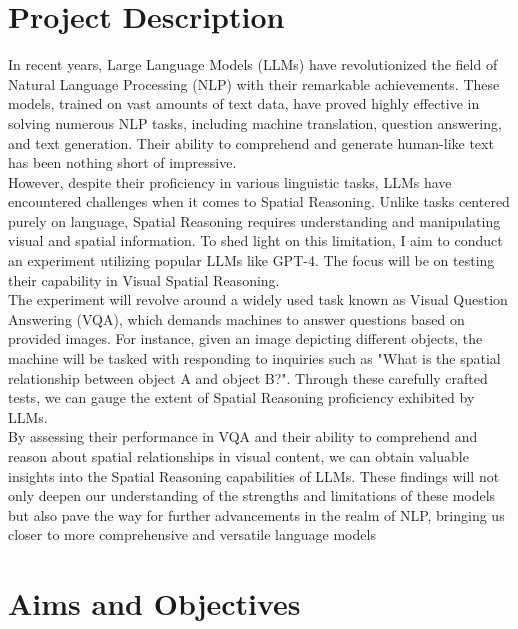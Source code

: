 \documentclass[journal,10pt]{IEEEtran}
\begin{document}

\section{Project Description}

In recent years, Large Language Models (LLMs) have revolutionized the field of Natural Language Processing (NLP) with their remarkable achievements. These models, trained on vast amounts of text data, have proved highly effective in solving numerous NLP tasks, including machine translation, question answering, and text generation. Their ability to comprehend and generate human-like text has been nothing short of impressive.\\

However, despite their proficiency in various linguistic tasks, LLMs have encountered challenges when it comes to Spatial Reasoning. Unlike tasks centered purely on language, Spatial Reasoning requires understanding and manipulating visual and spatial information. To shed light on this limitation, I aim to conduct an experiment utilizing popular LLMs like GPT-4. The focus will be on testing their capability in Visual Spatial Reasoning.\\

The experiment will revolve around a widely used task known as Visual Question Answering (VQA), which demands machines to answer questions based on provided images. For instance, given an image depicting different objects, the machine will be tasked with responding to inquiries such as "What is the spatial relationship between object A and object B?". Through these carefully crafted tests, we can gauge the extent of Spatial Reasoning proficiency exhibited by LLMs.\\

By assessing their performance in VQA and their ability to comprehend and reason about spatial relationships in visual content, we can obtain valuable insights into the Spatial Reasoning capabilities of LLMs. These findings will not only deepen our understanding of the strengths and limitations of these models but also pave the way for further advancements in the realm of NLP, bringing us closer to more comprehensive and versatile language models\\

\section{Aims and Objectives}
\end{document}
